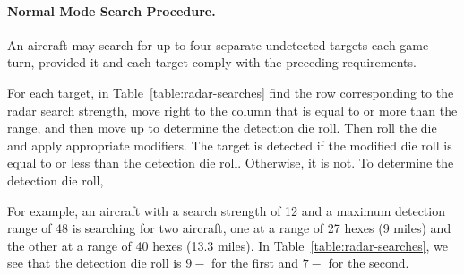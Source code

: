 {\begin{itemize}
\end{itemize}

\paragraph{Normal Mode Search Procedure.}
An aircraft may search for up to four separate undetected targets each game turn, provided it and each target comply with the preceding requirements. 

For each target, in Table~\ref{table:radar-searches} find the row corresponding to the radar search strength, move right to the column that is equal to or more than the range, and then move up to determine the detection die roll. Then roll the die and apply appropriate modifiers. The target is detected if the modified die roll is equal to or less than the detection die roll. Otherwise, it is not. To determine the detection die roll, 

For example, an aircraft with a search strength of 12 and a maximum detection range of 48 is searching for two aircraft, one at a range of 27 hexes (9 miles) and the other at a range of 40 hexes (13.3 miles). In Table~\ref{table:radar-searches}, we see that the detection die roll is $9-$ for the first and $7-$ for the second.


}
